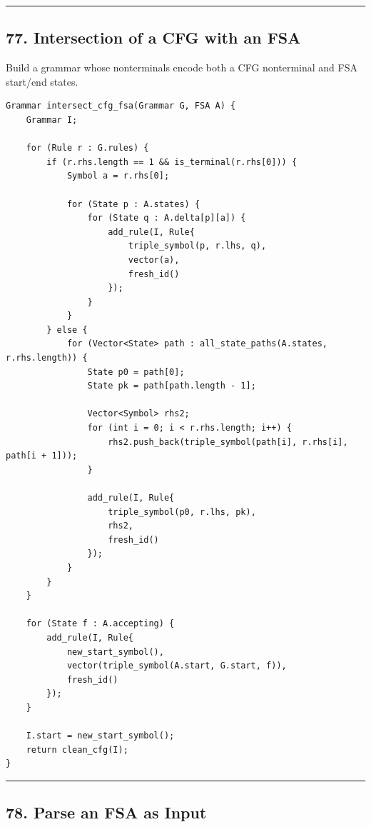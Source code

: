 \documentclass[10pt,letterpaper]{article}
\begin{document}
\medskip\hrule\medskip

\subsection*{77. Intersection of a CFG with an FSA}

Build a grammar whose nonterminals encode both a CFG nonterminal and FSA start/end states.

\begin{verbatim}
Grammar intersect_cfg_fsa(Grammar G, FSA A) {
    Grammar I;

    for (Rule r : G.rules) {
        if (r.rhs.length == 1 && is_terminal(r.rhs[0])) {
            Symbol a = r.rhs[0];

            for (State p : A.states) {
                for (State q : A.delta[p][a]) {
                    add_rule(I, Rule{
                        triple_symbol(p, r.lhs, q),
                        vector(a),
                        fresh_id()
                    });
                }
            }
        } else {
            for (Vector<State> path : all_state_paths(A.states, r.rhs.length)) {
                State p0 = path[0];
                State pk = path[path.length - 1];

                Vector<Symbol> rhs2;
                for (int i = 0; i < r.rhs.length; i++) {
                    rhs2.push_back(triple_symbol(path[i], r.rhs[i], path[i + 1]));
                }

                add_rule(I, Rule{
                    triple_symbol(p0, r.lhs, pk),
                    rhs2,
                    fresh_id()
                });
            }
        }
    }

    for (State f : A.accepting) {
        add_rule(I, Rule{
            new_start_symbol(),
            vector(triple_symbol(A.start, G.start, f)),
            fresh_id()
        });
    }

    I.start = new_start_symbol();
    return clean_cfg(I);
}
\end{verbatim}

\medskip\hrule\medskip

\subsection*{78. Parse an FSA as Input}
\end{document}
